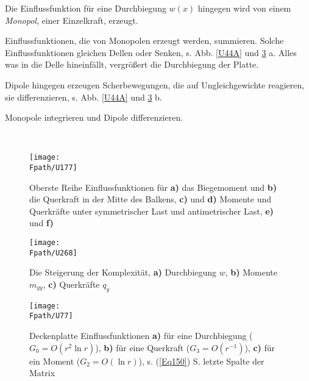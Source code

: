 Die Einflussfunktion f\"{u}r eine Durchbiegung $w(x)$ hingegen wird von einem {\em Monopol\/}, einer Einzelkraft, erzeugt.

Einflussfunktionen, die von Monopolen erzeugt werden, summieren. Solche Einflussfunktionen gleichen Dellen oder Senken, s. Abb. \ref{U44A} und \ref{U77} a. Alles was in die Delle hineinf\"{a}llt, vergr\"{o}{\ss}ert die Durchbiegung der Platte.

Dipole hingegen erzeugen Scherbewegungen, die auf Ungleichgewichte reagieren, sie differenzieren, s. Abb. \ref{U44A} und \ref{U77} b.\\

\hspace*{-12pt}\colorbox{highlightBlue}{\parbox{0.98\textwidth}{Monopole integrieren und Dipole differenzieren.}}\\


\begin{figure}[tbp]
\centering
\texttt{[image: \\Fpath/U177]}
\caption{Oberste Reihe Einflussfunktionen f\"{u}r \textbf{ a)} das Biegemoment und \textbf{ b)} die Querkraft in der Mitte des Balkens, \textbf{ c)} und \textbf{ d)} Momente und Querkr\"{a}fte unter symmetrischer Last und antimetrischer Last, \textbf{ e)} und \textbf{ f)}}
\label{U177}%
%
\end{figure}%
\begin{figure}[tbp]
\centering
\texttt{[image: \\Fpath/U268]}
\caption{Die Steigerung der Komplexit\"{a}t, \textbf{ a)} Durchbiegung $w$, \textbf{ b)} Momente $m_{yy}$, \textbf{ c)} Querkr\"{a}fte $q_y$ }
\label{U268}%
\end{figure}%
\begin{figure}[tbp]
\centering
\texttt{[image: \\Fpath/U77]}
\caption{Deckenplatte Einflussfunktionen \textbf{ a)} f\"{u}r eine Durchbiegung ($G_0 = O(r^2\ln r)$), \textbf{ b)} f\"{u}r eine Querkraft ($G_3 = O(r^{-1})$), \textbf{ c)} f\"{u}r ein Moment ($G_2 = O(\ln r)$), s. (\ref{Eq150}) S. \pageref{Eq150} letzte Spalte der Matrix}
\label{U77}%
\end{figure}%

